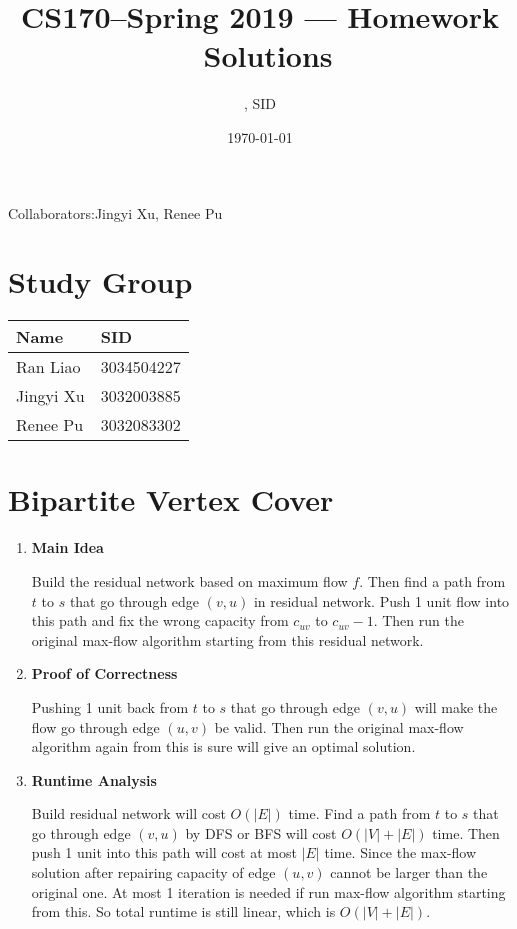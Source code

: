 \documentclass[11pt]{article}
\title{CS170--Spring 2019 --- Homework \Homework\ Solutions}
\author{\Name, SID \SID}
\date{\today}
\newenvironment{qparts}{\begin{enumerate}[{(}a{)}]}{\end{enumerate}}
\begin{document}
\maketitle
Collaborators:Jingyi Xu, Renee Pu

\section{Study Group}
	\begin{tabular}{ll}
		Name		&   SID         		\\\hline
		Ran Liao		&   3034504227  	\\  
		Jingyi Xu		&   3032003885  	\\
		Renee Pu		&   3032083302  	\\
	\end{tabular}

	
\newpage
\section{Bipartite Vertex Cover}
\begin{qparts}
	\item \textbf{Main Idea}
	
	Build the residual network based on maximum flow $f$. Then find a path from $t$ to $s$ that go through edge $(v, u)$ in residual network. Push 1 unit flow into this path and fix the wrong capacity from $c_{uv}$ to $c_{uv} - 1$. Then run the original max-flow algorithm starting from this residual network.

	\item \textbf{Proof of Correctness}
	
	Pushing 1 unit back from $t$ to $s$ that go through edge $(v, u)$ will make the flow go through edge $(u, v)$ be valid. Then run the original max-flow algorithm again from this is sure will give an optimal solution.
	
	\item \textbf{Runtime Analysis}
	
	Build residual network will cost $O(|E|)$ time. Find a path from $t$ to $s$ that go through edge $(v, u)$ by DFS or BFS will cost $O(|V| + |E|)$ time. Then push 1 unit into this path will cost at most $|E|$ time. Since the max-flow solution after repairing capacity of edge $(u, v)$ cannot be larger than the original one. At most 1 iteration is needed if run max-flow algorithm starting from this. So total runtime is still linear, which is $O(|V| + |E|)$.

\end{qparts}
\end{document}
